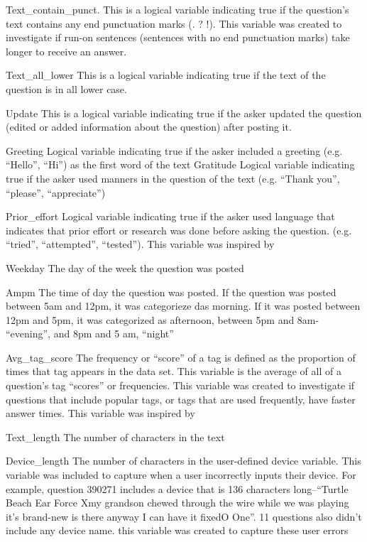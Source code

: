 \documentclass[12pt]{article}
\begin{document}
Text_contain_punct.
This is a logical variable indicating true if the question’s text contains any end punctuation marks (. ? !). This variable was created to investigate if run-on sentences (sentences with no end punctuation marks) take longer to receive an answer. 

Text_all_lower
This is a logical variable indicating true if the text of the question is in all lower case. 

Update 
This is a logical variable indicating true if the asker updated the question (edited or added information about the question) after posting it. 

Greeting
Logical variable indicating true if the asker included a greeting (e.g. “Hello”, “Hi”) as the first word of the text
Gratitude
Logical variable indicating true if the asker used manners in the question of the text (e.g. “Thank you”, “please”, “appreciate”)

Prior_effort 
Logical variable indicating true if the asker used language that indicates that prior effort or research was done before asking the question. (e.g. “tried”, “attempted”, “tested”). This variable was inspired by 

Weekday 
The day of the week the question was posted

Ampm 
The time of day the question was posted. If the question was posted between 5am and 12pm, it was categorieze das morning. If it was posted between 12pm and 5pm, it was categorized as afternoon, between 5pm and 8am- “evening”, and 8pm and 5 am, “night”

Avg_tag_score
The frequency or “score” of a tag is defined as the proportion of times that tag appears in the data set. This variable is the average of all of a question’s tag “scores” or frequencies. This variable was created to investigate if questions that include popular tags, or tags that are used frequently, have faster answer times. This variable was inspired by 

Text_length
The number of characters in the text

Device_length
The number of characters in the user-defined device variable. This variable was included to capture when a user incorrectly inputs their device. For example, question 390271 includes a device that is 136 characters long--“Turtle Beach Ear Force Xmy grandson chewed through the wire while we was playing it's brand-new is there anyway I can have it fixedO One”. 11 questions also didn’t include any device name. this variable was created to capture these user errors
\end{document}
